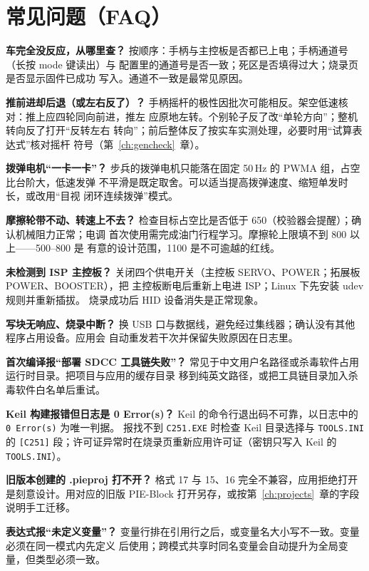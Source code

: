 \chapter{常见问题（FAQ）}
\label{app:faq}

\textbf{车完全没反应，从哪里查？}\quad
按顺序：手柄与主控板是否都已上电；手柄通道号（长按 mode 键读出）与
配置里的通道号是否一致；死区是否填得过大；烧录页是否显示固件已成功
写入。通道不一致是最常见原因。

\textbf{推前进却后退（或左右反了）？}\quad
手柄摇杆的极性因批次可能相反。架空低速核对：推上应四轮同向前进，推左
应原地左转。个别轮子反了改“单轮方向”；整机转向反了打开“反转左右
转向”；前后整体反了按实车实测处理，必要时用“试算表达式”核对摇杆
符号（第~\ref{ch:gencheck}~章）。

\textbf{拨弹电机“一卡一卡”？}\quad
步兵的拨弹电机只能落在固定 50\,Hz 的 PWMA 组，占空比台阶大，低速发弹
不平滑是既定取舍。可以适当提高拨弹速度、缩短单发时长，或改用“目视
闭环连续拨弹”模式。

\textbf{摩擦轮带不动、转速上不去？}\quad
检查目标占空比是否低于 650（校验器会提醒）；确认机械阻力正常；电调
首次使用需完成油门行程学习。摩擦轮上限填不到 800 以上——500--800 是
有意的设计范围，1100 是不可逾越的红线。

\textbf{未检测到 ISP 主控板？}\quad
关闭四个供电开关（主控板 SERVO、POWER；拓展板 POWER、BOOSTER），把
主控板断电后重新上电进 ISP；Linux 下先安装 udev 规则并重新插拔。
烧录成功后 HID 设备消失是正常现象。

\textbf{写块无响应、烧录中断？}\quad
换 USB 口与数据线，避免经过集线器；确认没有其他程序占用设备。应用会
自动重发若干次并保留失败原因在日志里。

\textbf{首次编译报“部署 SDCC 工具链失败”？}\quad
常见于中文用户名路径或杀毒软件占用运行时目录。把项目与应用的缓存目录
移到纯英文路径，或把工具链目录加入杀毒软件白名单后重试。

\textbf{Keil 构建报错但日志是 0 Error(s)？}\quad
Keil 的命令行退出码不可靠，以日志中的 \texttt{0 Error(s)} 为唯一判据。
报找不到 \texttt{C251.EXE} 时检查 Keil 目录选择与 \texttt{TOOLS.INI}
的 \texttt{[C251]} 段；许可证异常时在烧录页重新应用许可证（密钥只写入
Keil 的 \texttt{TOOLS.INI}）。

\textbf{旧版本创建的 .pieproj 打不开？}\quad
格式 17 与 15、16 完全不兼容，应用拒绝打开是刻意设计。用对应的旧版
PIE-Block 打开另存，或按第~\ref{ch:projects}~章的字段说明手工迁移。

\textbf{表达式报“未定义变量”？}\quad
变量行排在引用行之后，或变量名大小写不一致。变量必须在同一模式内先定义
后使用；跨模式共享时同名变量会自动提升为全局变量，但类型必须一致。

